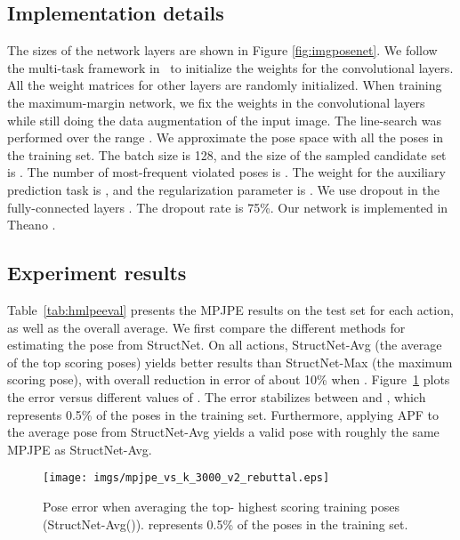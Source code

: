 \documentclass[10pt,twocolumn,letterpaper]{article}
\begin{document}
\subsection{Implementation details}
\vspace{-0.1in}
The sizes of the network layers are shown in Figure \ref{fig:imgposenet}.
We follow the multi-task framework in~\cite{accv2014} to initialize the weights for the convolutional layers. All the weight matrices for other layers are randomly initialized.
When training the maximum-margin network, we fix the weights in the convolutional layers while still doing the  data augmentation of the input image.
The line-search was performed over the range .
We approximate the pose space  with all the poses in the training set. The batch size is 128, 
and the size of the sampled candidate set is . The number of most-frequent violated poses is .
The weight for the auxiliary prediction task is , and the regularization parameter is .
We use dropout in the fully-connected layers . 
The dropout rate is 75\%. Our network is implemented in Theano \cite{Bastien-Theano-2012}.


  
\subsection{Experiment results}
\vspace{-0.05in}



Table~\ref{tab:hmlpeeval} presents the MPJPE results on the test set for each action, as well as the overall average.
We first compare the different methods for estimating the pose from StructNet.
On all actions, StructNet-Avg (the average of the top scoring poses) yields better results than StructNet-Max (the maximum scoring pose), with overall reduction in error of about 10\% when .
Figure~\ref{fig:topkvsmpjpe} plots the error versus different values of .  The error stabilizes between  and , which represents 0.5\% of the poses in the training set.
Furthermore, applying APF to the average pose from StructNet-Avg yields a valid pose with roughly the same MPJPE as StructNet-Avg.

\begin{figure}
\begin{center}  
\texttt{[image: imgs/mpjpe\_vs\_k\_3000\_v2\_rebuttal.eps]}
\end{center}
\vspace{-0.2in}
   \caption{Pose error when averaging the top- highest scoring training poses (StructNet-Avg()).  represents 0.5\% of the poses in the training set.
}
\label{fig:topkvsmpjpe}
\vspace{-0.2in}
\end{figure}
\end{document}
